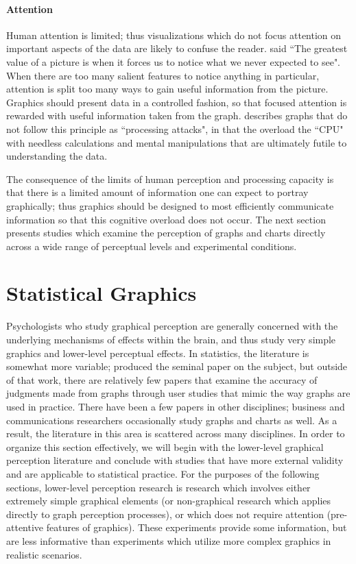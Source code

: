 \documentclass[11pt]{isuthesis}\usepackage[]{graphicx}\usepackage[]{color}
\begin{document}
\paragraph{Attention}
Human attention is limited; thus visualizations which do not focus attention on important aspects of the data are likely to confuse the reader. \citet{eda} said ``The greatest value of a picture is when it forces us to notice what we never expected to see". When there are too many salient features to notice anything in particular, attention is split too many ways to gain useful information from the picture. Graphics should present data in a controlled fashion, so that focused attention is rewarded with useful information taken from the graph. \citet{conti2005attacking} describes graphs that do not follow this principle as ``processing attacks", in that the overload the ``CPU" with needless calculations and mental manipulations that are ultimately futile to understanding the data. 

The consequence of the limits of human perception and processing capacity is that there is a limited amount of information one can expect to portray graphically; thus graphics should be designed to most efficiently communicate information so that this cognitive overload does not occur. The next section presents studies which examine the perception of graphs and charts directly across a wide range of perceptual levels and experimental conditions. 

\section{Statistical Graphics}
Psychologists who study graphical perception are generally concerned with the underlying mechanisms of effects within the brain, and thus study very simple graphics and lower-level perceptual effects. In statistics, the literature is somewhat more variable; \citet{cleveland:1985} produced the seminal paper on the subject, but outside of that work, there are relatively few papers that examine the accuracy of judgments made from graphs through user studies that mimic the way graphs are used in practice. There have been a few papers in other disciplines; business and communications researchers occasionally study graphs and charts as well. As a result, the literature in this area is scattered across many disciplines. In order to organize this section effectively, we will begin with the lower-level graphical perception literature and conclude with studies that have more external validity and are applicable to statistical practice. For the purposes of the following sections, lower-level perception research is research which involves either extremely simple graphical elements (or non-graphical research which applies directly to graph perception processes), or which does not require attention (pre-attentive features of graphics). These experiments provide some information, but are less informative than experiments which utilize more complex graphics in realistic scenarios. 
\end{document}
